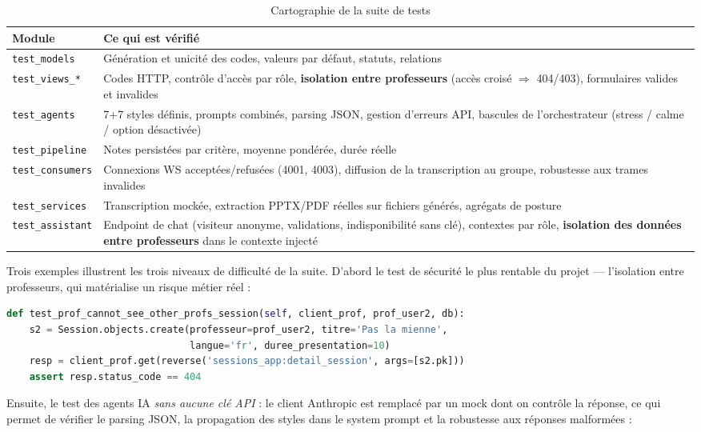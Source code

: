 \documentclass[12pt,a4paper]{report}
\begin{document}
\begin{table}[H]
\centering\small
\begin{tabular}{lp{9.8cm}}
\toprule
\textbf{Module} & \textbf{Ce qui est vérifié} \\
\midrule
\texttt{test\_models} & Génération et unicité des codes, valeurs par défaut, statuts, relations \\
\texttt{test\_views\_*} & Codes HTTP, contrôle d'accès par rôle, \textbf{isolation entre professeurs} (accès croisé $\Rightarrow$ 404/403), formulaires valides et invalides \\
\texttt{test\_agents} & 7+7 styles définis, prompts combinés, parsing JSON, gestion d'erreurs API, bascules de l'orchestrateur (stress / calme / option désactivée) \\
\texttt{test\_pipeline} & Notes persistées par critère, moyenne pondérée, durée réelle \\
\texttt{test\_consumers} & Connexions WS acceptées/refusées (4001, 4003), diffusion de la transcription au groupe, robustesse aux trames invalides \\
\texttt{test\_services} & Transcription mockée, extraction PPTX/PDF réelles sur fichiers générés, agrégats de posture \\
\texttt{test\_assistant} & Endpoint de chat (visiteur anonyme, validations, indisponibilité sans clé), contextes par rôle, \textbf{isolation des données entre professeurs} dans le contexte injecté \\
\bottomrule
\end{tabular}
\caption{Cartographie de la suite de tests}
\end{table}

Trois exemples illustrent les trois niveaux de difficulté de la suite.
D'abord le test de sécurité le plus rentable du projet --- l'isolation entre
professeurs, qui matérialise un risque métier réel :

\begin{lstlisting}[language=Python, caption={Niveau 1 : isolation entre professeurs}]
def test_prof_cannot_see_other_profs_session(self, client_prof, prof_user2, db):
    s2 = Session.objects.create(professeur=prof_user2, titre='Pas la mienne',
                                langue='fr', duree_presentation=10)
    resp = client_prof.get(reverse('sessions_app:detail_session', args=[s2.pk]))
    assert resp.status_code == 404
\end{lstlisting}

Ensuite, le test des agents IA \emph{sans aucune clé API} : le client
Anthropic est remplacé par un mock dont on contrôle la réponse, ce qui permet
de vérifier le parsing JSON, la propagation des styles dans le system prompt
et la robustesse aux réponses malformées :
\end{document}
